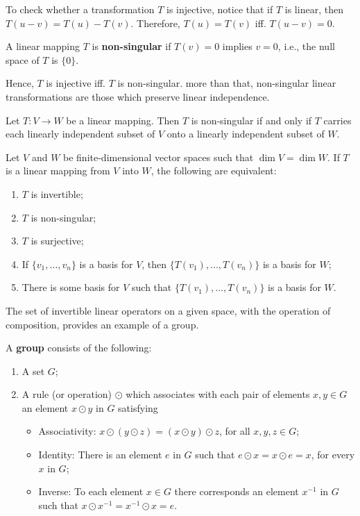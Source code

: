 To check whether a transformation $T$ is injective, notice that if $T$ is linear, then $T(u-v) = T(u) - T(v)$. Therefore, $T(u) = T(v)$ iff. $T(u - v) = 0$.

\begin{definition}
	A linear mapping $T$ is \textbf{non-singular} if $T(v) = 0$ implies $v = 0$, i.e., the null space of $T$ is $\{ 0 \}$.
\end{definition}

Hence, $T$ is injective iff. $T$ is non-singular. more than that, non-singular linear transformations are those which preserve linear independence. 

\begin{theorem}
	Let $T : V \longrightarrow W$ be a linear mapping. Then $T$ is non-singular if and only if $T$ carries each linearly independent subset of $V$ onto a linearly independent subset of $W$. 
\end{theorem}

\begin{theorem}
	Let $V$ and $W$ be finite-dimensional vector spaces such that $\dim V = \dim W$. If $T$ is a linear mapping from $V$ into $W$, the following are equivalent:
	\begin{enumerate}
		\item $T$ is invertible;
		\item $T$ is non-singular;
		\item $T$ is surjective;
		\item If $\{ v_1, \ldots, v_n \}$ is a basis for $V$, then $\{ T(v_1), \ldots, T(v_n) \}$ is a basis for $W$;
		\item There is some basis for $V$ such that $\{ T(v_1), \ldots, T(v_n) \}$ is a basis for $W$.
	\end{enumerate}
\end{theorem}

The set of invertible linear operators on a given space, with the operation of composition, provides an example of a group.

\begin{definition}[Group]
	A \textbf{group} consists of the following:
	\begin{enumerate}
		\item A set $G$;
		\item A rule (or operation) $\odot$ which associates with each pair of elements $x, y \in G$ an element $x \odot y$ in $G$ satisfying
			\begin{itemize}
				\item Associativity: $x \odot (y \odot z) = (x \odot y) \odot z$, for all $x, y, z \in G$;
				\item Identity: There is an element $e$ in $G$ such that $e \odot x = x \odot e = x$, for every $x$ in $G$;
				\item Inverse: To each element $x \in G$ there corresponds an element $x^{-1}$ in $G$ such that $x \odot x^{-1} = x^{-1} \odot x = e$.
			\end{itemize}
	\end{enumerate}
\end{definition}

